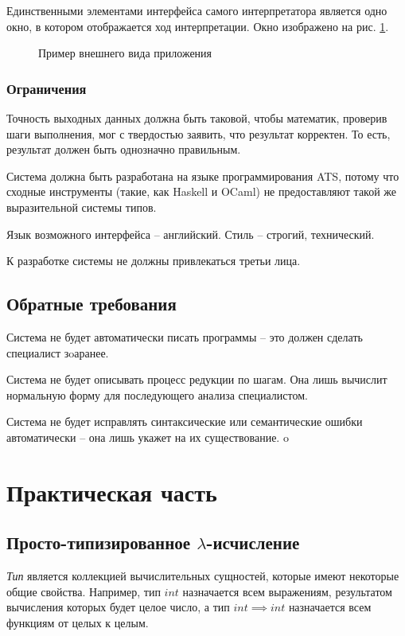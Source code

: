 Единственными элементами интерфейса самого интерпретатора является одно окно, в котором отображается ход интерпретации. Окно изображено на рис. \ref{example}.

\begin{figure}
\caption{Пример внешнего вида приложения}
\label{example}
\end{figure}

\subsubsection{Ограничения}

Точность выходных данных должна быть таковой, чтобы математик, проверив шаги выполнения, мог с твердостью заявить, что результат корректен. То есть, результат должен быть однозначно правильным.

Система должна быть разработана на языке программирования ATS, потому что сходные инструменты (такие, как Haskell и OCaml) не предоставляют такой же выразительной системы типов.

Язык возможного интерфейса – английский. Стиль – строгий, технический.

К разработке системы не должны привлекаться третьи лица.

\subsection{Обратные требования}

Система не будет автоматически писать программы – это должен сделать специалист зoаранее.

Система не будет описывать процесс редукции по шагам. Она лишь вычислит нормальную форму для последующего анализа специалистом.

Система не будет исправлять синтаксические или семантические ошибки автоматически – она лишь укажет на их существование.
o
\section{Практическая часть}

\subsection{Просто-типизированное $\lambda$-исчисление}
\label{sec:stlc}

\emph{Тип} является коллекцией вычислительных сущностей, которые имеют некоторые общие свойства. Например, тип $int$ назначается всем выражениям, результатом вычисления которых будет целое число, а тип $int \implies int$ назначается всем функциям от целых к целым.

